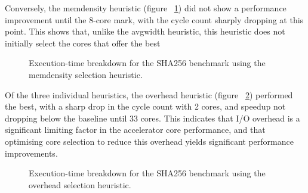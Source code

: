 \documentclass{UoYCSproject}
\begin{document}
Conversely, the memdensity heuristic (figure ~\ref{fig:breakdownMemDensitySHA256})
did not show a performance improvement until the 8-core mark, with
the cycle count sharply dropping at this point. This shows that, unlike the avgwidth heuristic, this heuristic
does not initially select the cores that offer the best 

\begin{figure}[H]
\caption{Execution-time breakdown for the SHA256 benchmark using the memdensity selection heuristic.}
\label{fig:breakdownMemDensitySHA256}
\end{figure}

Of the three individual heuristics, the overhead heuristic (figure ~\ref{fig:breakdownOverheadSHA256})
performed the best, with a sharp drop in the cycle count
with 2 cores, and speedup not dropping below the baseline until 33 cores. This indicates that I/O overhead is a significant
limiting factor in the accelerator core performance, and that optimising core selection to reduce this overhead yields
significant performance improvements.

\begin{figure}[H]
\caption{Execution-time breakdown for the SHA256 benchmark using the overhead selection heuristic.}
\label{fig:breakdownOverheadSHA256}
\end{figure}
\end{document}
